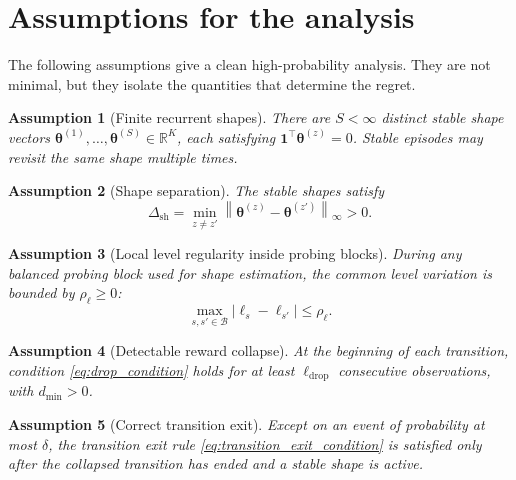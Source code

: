 \documentclass[11pt]{article}
\newtheorem{assumption}{Assumption}
\newcommand{\R}{\mathbb R}
\newcommand{\one}{\bm 1}
\newcommand{\norm}[1]{\left\lVert #1 \right\rVert}
\newcommand{\abs}[1]{\left\lvert #1 \right\rvert}
\begin{document}
\section{Assumptions for the analysis}
\label{sec:assumptions}

The following assumptions give a clean high-probability analysis. They are not minimal, but they isolate the quantities that determine the regret.

\begin{assumption}[Finite recurrent shapes]
\label{ass:finite_shapes}
There are $S<\infty$ distinct stable shape vectors $\bm\theta^{(1)},\ldots,\bm\theta^{(S)}\in\R^K$, each satisfying $\one^\top\bm\theta^{(z)}=0$. Stable episodes may revisit the same shape multiple times.
\end{assumption}

\begin{assumption}[Shape separation]
\label{ass:shape_separation}
The stable shapes satisfy
\begin{equation}
\label{eq:ass_shape_separation}
\Delta_{\mathrm{sh}}
=
\min_{z\neq z'}
\norm{\bm\theta^{(z)}-\bm\theta^{(z')}}_{\infty}
>0.
\end{equation}
\end{assumption}

\begin{assumption}[Local level regularity inside probing blocks]
\label{ass:level_regular}
During any balanced probing block used for shape estimation, the common level variation is bounded by $\rho_{\ell}\geq0$:
\begin{equation}
\label{eq:level_regular}
\max_{s,s'\in\mathcal B}
\abs{\ell_s-\ell_{s'}}
\leq
\rho_{\ell}.
\end{equation}
\end{assumption}

\begin{assumption}[Detectable reward collapse]
\label{ass:detectable_collapse}
At the beginning of each transition, condition \eqref{eq:drop_condition} holds for at least $\ell_{\mathrm{drop}}$ consecutive observations, with $d_{\min}>0$.
\end{assumption}

\begin{assumption}[Correct transition exit]
\label{ass:correct_exit}
Except on an event of probability at most $\delta$, the transition exit rule \eqref{eq:transition_exit_condition} is satisfied only after the collapsed transition has ended and a stable shape is active.
\end{assumption}
\end{document}
